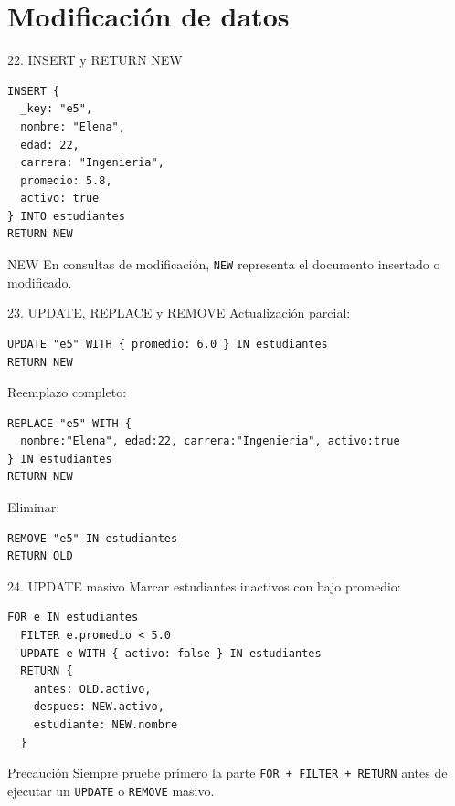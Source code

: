 \documentclass[aspectratio=169,11pt]{beamer}
\begin{document}
\section{Modificación de datos}

\begin{frame}[fragile]{22. INSERT y RETURN NEW}
\begin{lstlisting}
INSERT {
  _key: "e5",
  nombre: "Elena",
  edad: 22,
  carrera: "Ingenieria",
  promedio: 5.8,
  activo: true
} INTO estudiantes
RETURN NEW
\end{lstlisting}

\begin{block}{NEW}
En consultas de modificación, \texttt{NEW} representa el documento insertado o modificado.
\end{block}
\end{frame}

\begin{frame}[fragile]{23. UPDATE, REPLACE y REMOVE}
Actualización parcial:
\begin{lstlisting}
UPDATE "e5" WITH { promedio: 6.0 } IN estudiantes
RETURN NEW
\end{lstlisting}

Reemplazo completo:
\begin{lstlisting}
REPLACE "e5" WITH {
  nombre:"Elena", edad:22, carrera:"Ingenieria", activo:true
} IN estudiantes
RETURN NEW
\end{lstlisting}

Eliminar:
\begin{lstlisting}
REMOVE "e5" IN estudiantes
RETURN OLD
\end{lstlisting}
\end{frame}

\begin{frame}[fragile]{24. UPDATE masivo}
Marcar estudiantes inactivos con bajo promedio:

\begin{lstlisting}
FOR e IN estudiantes
  FILTER e.promedio < 5.0
  UPDATE e WITH { activo: false } IN estudiantes
  RETURN {
    antes: OLD.activo,
    despues: NEW.activo,
    estudiante: NEW.nombre
  }
\end{lstlisting}

\begin{alertblock}{Precaución}
Siempre pruebe primero la parte \texttt{FOR + FILTER + RETURN} antes de ejecutar un \texttt{UPDATE} o \texttt{REMOVE} masivo.
\end{alertblock}
\end{frame}
\end{document}
